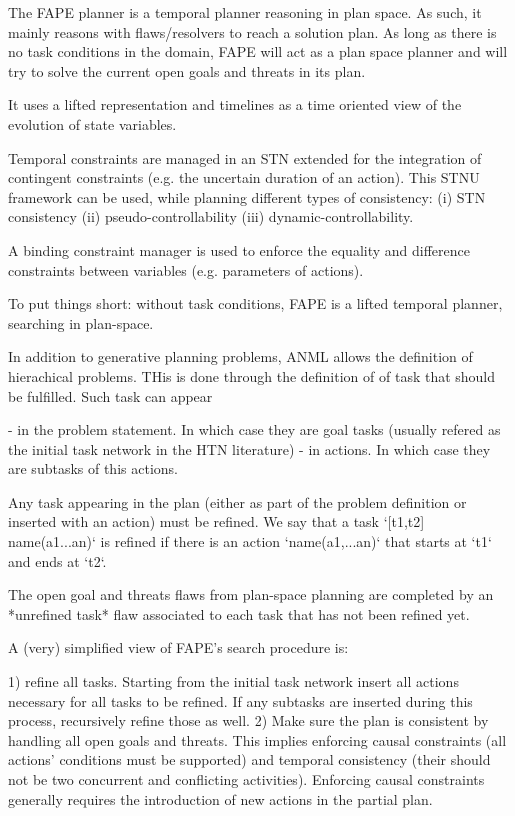 The FAPE planner is a temporal planner reasoning in plan space. As such, it mainly reasons with flaws/resolvers to reach a solution plan.
As long as there is no task conditions in the domain, FAPE will act as a plan space planner and will try to solve the current open goals and threats in its plan.

It uses a lifted representation and timelines as a time oriented view of the evolution of state variables.

Temporal constraints are managed in an STN extended for the integration of contingent constraints (e.g. the uncertain duration of an action). This STNU framework can be used, while planning different types of consistency: (i) STN consistency (ii) pseudo-controllability (iii) dynamic-controllability.

A binding constraint manager is used to enforce the equality and difference constraints between variables (e.g. parameters of actions).

To put things short: without task conditions, FAPE is a lifted temporal planner, searching in plan-space.



In addition to generative planning problems, ANML allows the
definition of hierachical problems.  THis is done through the
definition of of task that should be fulfilled. Such task can appear

 - in the problem statement. In which case they are goal tasks
   (usually refered as the initial task network in the HTN literature)
 - in actions. In which case they are subtasks of this actions.

Any task appearing in the plan (either as part of the problem
definition or inserted with an action) must be refined. We say that a
task `[t1,t2] name(a1...an)` is refined if there is an action
`name(a1,...an)` that starts at `t1` and ends at `t2`.

The open goal and threats flaws from plan-space planning are completed
by an *unrefined task* flaw associated to each task that has not been
refined yet.

A (very) simplified view of FAPE's search procedure is:

 1) refine all tasks. Starting from the initial task network insert
 all actions necessary for all tasks to be refined. If any subtasks
 are inserted during this process, recursively refine those as well.
 2) Make sure the plan is consistent by handling all open goals and
 threats. This implies enforcing causal constraints (all actions'
 conditions must be supported) and temporal consistency (their should
 not be two concurrent and conflicting activities). Enforcing causal
 constraints generally requires the introduction of new actions in the
 partial plan.



